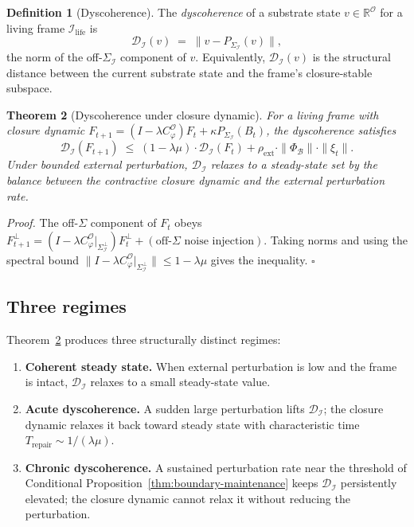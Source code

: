 \documentclass[11pt]{article}
\theoremstyle{plain}
\newtheorem{theorem}{Theorem}[section]
\theoremstyle{definition}
\newtheorem{definition}[theorem]{Definition}
\theoremstyle{remark}
\newcommand{\Ical}{\mathcal{I}}
\newcommand{\Ocal}{\mathcal{O}}
\newcommand{\Bcal}{\mathcal{B}}
\newcommand{\Dcal}{\mathcal{D}}
\newcommand{\Cph}{C_\varphi}
\newcommand{\Ilife}{\Ical_{\mathrm{life}}}
\begin{document}
\begin{definition}[Dyscoherence]\label{def:dyscoherence}
The \emph{dyscoherence} of a substrate state $v \in \mathbb{R}^\Ocal$ for a living frame $\Ilife$ is
\[
  \Dcal_\Ical(v) \;=\; \| v - P_{\Sigma_\Ical}(v) \|,
\]
the norm of the off-$\Sigma_\Ical$ component of $v$. Equivalently, $\Dcal_\Ical(v)$ is the structural distance between the current substrate state and the frame's closure-stable subspace.
\end{definition}

\begin{theorem}[Dyscoherence under closure dynamic]\label{thm:dyscoherence-decay}
For a living frame with closure dynamic $F_{t+1} = (I - \lambda \Cph^\Ocal) F_t + \kappa P_{\Sigma_\Ical}(B_t)$, the dyscoherence satisfies
\[
  \Dcal_\Ical(F_{t+1}) \;\leq\; (1 - \lambda \mu) \cdot \Dcal_\Ical(F_t) + \rho_{\mathrm{ext}} \cdot \|\Phi_\Bcal\| \cdot \|\xi_t\|.
\]
Under bounded external perturbation, $\Dcal_\Ical$ relaxes to a steady-state set by the balance between the contractive closure dynamic and the external perturbation rate.
\end{theorem}

\noindent\emph{Proof.} The off-$\Sigma$ component of $F_t$ obeys $F^\perp_{t+1} = (I - \lambda \Cph^\Ocal|_{\Sigma_\Ical^\perp}) F^\perp_t + (\text{off-}\Sigma\text{ noise injection})$. Taking norms and using the spectral bound $\|I - \lambda \Cph^\Ocal|_{\Sigma_\Ical^\perp}\| \leq 1 - \lambda \mu$ gives the inequality. \hfill$\square$

\subsection{Three regimes}

Theorem~\ref{thm:dyscoherence-decay} produces three structurally distinct regimes:

\begin{enumerate}[leftmargin=2em]
\item \textbf{Coherent steady state.} When external perturbation is low and the frame is intact, $\Dcal_\Ical$ relaxes to a small steady-state value.
\item \textbf{Acute dyscoherence.} A sudden large perturbation lifts $\Dcal_\Ical$; the closure dynamic relaxes it back toward steady state with characteristic time $T_{\mathrm{repair}} \sim 1/(\lambda \mu)$.
\item \textbf{Chronic dyscoherence.} A sustained perturbation rate near the threshold of Conditional Proposition~\ref{thm:boundary-maintenance} keeps $\Dcal_\Ical$ persistently elevated; the closure dynamic cannot relax it without reducing the perturbation.
\end{enumerate}
\end{document}
